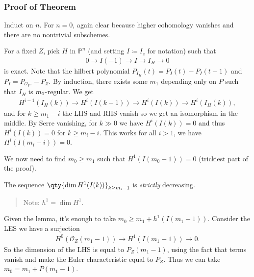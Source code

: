 \hypertarget{proof-of-theorem}{%
\subsubsection{Proof of Theorem}\label{proof-of-theorem}}

Induct on \(n\). For \(n=0\), again clear because higher cohomology
vanishes and there are no nontrivial subschemes.

For a fixed \(Z\), pick \(H\) in \({\mathbb{P}}^n\) (and setting
\(I \coloneqq I_z\) for notation) such that
\begin{align*}
0 \to I(-1) \to I \to I_H \to 0
\end{align*}
is exact. Note that the hilbert polynomial
\(P_{I_H}(t) = P_I(t) - P_I(t-1)\) and
\(P_I = P_{{\mathcal{O}}_{{\mathbb{P}}^n}} - P_Z\). By induction, there
exists some \(m_1\) depending only on \(P\) such that \(I_H\) is
\(m_1{\hbox{-}}\)regular. We get
\begin{align*}
H^{i-1}(I_H(k)) \to H^i(I(k-1)) \to H^i(I(k)) \to H^i(I_H(k))
,\end{align*}
and for \(k\geq m_1 - i\) the LHS and RHS vanish so we get an
isomorphism in the middle. By Serre vanishing, for \(k \gg 0\) we have
\(H^i(I(k)) = 0\) and thus \(H^i(I(k)) = 0\) for \(k\geq m_i - i\). This
works for all \(i > 1\), we have \(H^i(I(m_i - i)) = 0\).

We now need to find \(m_0 \geq m_1\) such that \(H^1(I(m_0 - 1)) = 0\)
(trickiest part of the proof).

\begin{description}
\tightlist
\item[Lemma]
The sequence \(\qty{\dim H^1(I(k))}_{k\geq m_i - 1}\) is \emph{strictly}
decreasing.
\end{description}

\begin{quote}
Note: \(h^1 = \dim H^1\).
\end{quote}

Given the lemma, it's enough to take \(m_0 \geq m_1 + h^1(I(m_1 - 1))\).
Consider the LES we have a surjection
\begin{align*}
H^0({\mathcal{O}}_Z(m_1 - 1)) \to H^1(I(m_1 - 1)) \to 0
.\end{align*}
So the dimension of the LHS is equal to \(P_Z(m_1 - 1)\), using the fact
that terms vanish and make the Euler characteristic equal to \(P_Z\).
Thus we can take \(m_0 = m_1 + P(m_1 - 1)\).

